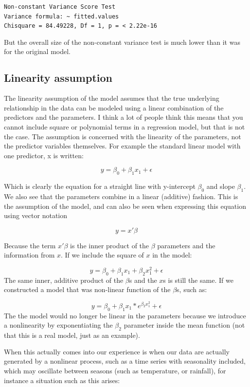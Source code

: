 \documentclass[
  letterpaper,
  DIV=11,
  numbers=noendperiod]{scrreprt}
\begin{document}
\begin{verbatim}
Non-constant Variance Score Test 
Variance formula: ~ fitted.values 
Chisquare = 84.49228, Df = 1, p = < 2.22e-16
\end{verbatim}

But the overall size of the non-constant variance test is much lower
than it was for the original model.

\hypertarget{linearity-assumption}{%
\subsection{Linearity assumption}\label{linearity-assumption}}

The linearity assumption of the model assumes that the true underlying
relationship in the data can be modeled using a linear combination of
the predictors and the parameters. I think a lot of people think this
means that you cannot include square or polynomial terms in a regression
model, but that is not the case. The assumption is concerned with the
linearity of the parameters, not the predictor variables themselves. For
example the standard linear model with one predictor, x is written:

\[y = \beta_0 + \beta_1 x_1 + \epsilon\]

Which is clearly the equation for a straight line with y-intercept
\(\beta_0\) and slope \(\beta_1\). We also see that the parameters
combine in a linear (additive) fashion. This is the assumption of the
model, and can also be seen when expressing this equation using vector
notation

\[y = x' \beta\]

Because the term \(x' \beta\) is the inner product of the \(\beta\)
parameters and the information from \(x\). If we include the square of
\(x\) in the model:

\[y = \beta_0 + \beta_1 x_1 + \beta_2 x_1^2 + \epsilon\] The same inner,
additive product of the \(\beta\)s and the \(x\)s is still the same. If
we constructed a model that was non-linear function of the \(\beta\)s,
such as:

\[y = \beta_0 + \beta_1 x_1 *  e^{\beta_2 x_1^2} + \epsilon\] The the
model would no longer be linear in the parameters because we introduce a
nonlinearity by exponentiating the \(\beta_2\) parameter inside the mean
function (not that this is a real model, just as an example).

When this actually comes into our experience is when our data are
actually generated by a nonlinear process, such as a time series with
seasonality included, which may oscillate between seasons (such as
temperature, or rainfall), for instance a situation such as this arises:
\end{document}
